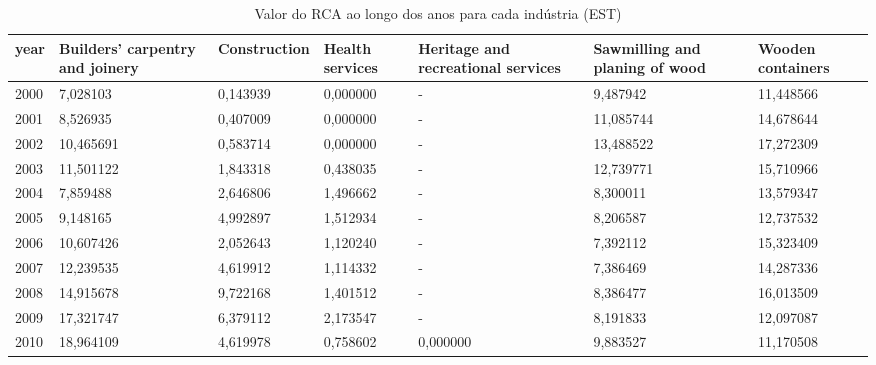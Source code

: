\begin{table}
\centering
\caption{Valor do RCA ao longo dos anos para cada indústria (EST)}
\begin{tabular}{p{1cm}p{2cm}p{2cm}p{2cm}p{2cm}p{2cm}p{2cm}}
\toprule
 year &  Builders' carpentry and joinery &  Construction &  Health services &  Heritage and recreational services &  Sawmilling and planing of wood &  Wooden containers \\
\midrule
 2000 &                         7,028103 &      0,143939 &         0,000000 &                                   - &                        9,487942 &          11,448566 \\
 2001 &                         8,526935 &      0,407009 &         0,000000 &                                   - &                       11,085744 &          14,678644 \\
 2002 &                        10,465691 &      0,583714 &         0,000000 &                                   - &                       13,488522 &          17,272309 \\
 2003 &                        11,501122 &      1,843318 &         0,438035 &                                   - &                       12,739771 &          15,710966 \\
 2004 &                         7,859488 &      2,646806 &         1,496662 &                                   - &                        8,300011 &          13,579347 \\
 2005 &                         9,148165 &      4,992897 &         1,512934 &                                   - &                        8,206587 &          12,737532 \\
 2006 &                        10,607426 &      2,052643 &         1,120240 &                                   - &                        7,392112 &          15,323409 \\
 2007 &                        12,239535 &      4,619912 &         1,114332 &                                   - &                        7,386469 &          14,287336 \\
 2008 &                        14,915678 &      9,722168 &         1,401512 &                                   - &                        8,386477 &          16,013509 \\
 2009 &                        17,321747 &      6,379112 &         2,173547 &                                   - &                        8,191833 &          12,097087 \\
 2010 &                        18,964109 &      4,619978 &         0,758602 &                            0,000000 &                        9,883527 &          11,170508 \\

\end{tabular}
\end{table}
